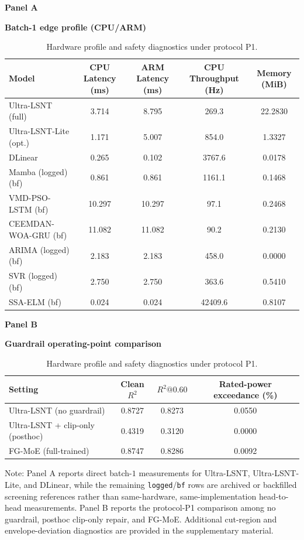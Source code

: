 ﻿\documentclass[review,1p,times]{elsarticle}
\newcommand{\aePanelHeading}[2]{%
  \par\vspace{2pt}%
  \noindent\begin{minipage}{\linewidth}
    \centering
    \textbf{#1}\par
    \textbf{#2}\par
  \end{minipage}%
  \par\vspace{2pt}%
}
\newcommand{\aeTableNote}[1]{%
  \par\vspace{2pt}%
  \noindent\begin{minipage}{\linewidth}
    \raggedright\footnotesize
    Note: #1
  \end{minipage}%
  \par
}
\begin{document}
\begin{table}[t]
\centering
\caption{Hardware profile and safety diagnostics under protocol P1.}
\label{tab:table4_hardware_safety}
\label{tab:main4_hardware_safety_joint}
\label{tab:master_hardware}
\label{tab:matrix_ablation_physics}
\footnotesize
\setlength{\tabcolsep}{4pt}
\aePanelHeading{Panel A}{Batch-1 edge profile (CPU/ARM)}
\begin{tabular*}{\linewidth}{@{\extracolsep{\fill}}lcccc@{}}
\toprule
\textbf{Model} & \textbf{CPU Latency (ms)} & \textbf{ARM Latency (ms)} & \textbf{CPU Throughput (Hz)} & \textbf{Memory (MiB)} \\
\midrule
Ultra-LSNT (full) & 3.714 & 8.795 & 269.3 & 22.2830 \\
Ultra-LSNT-Lite (opt.) & 1.171 & 5.007 & 854.0 & 1.3327 \\
DLinear & 0.265 & 0.102 & 3767.6 & 0.0178 \\
Mamba (logged) (bf) & 0.861 & 0.861 & 1161.1 & 0.1468 \\
VMD-PSO-LSTM (bf) & 10.297 & 10.297 & 97.1 & 0.2468 \\
CEEMDAN-WOA-GRU (bf) & 11.082 & 11.082 & 90.2 & 0.2130 \\
ARIMA (logged) (bf) & 2.183 & 2.183 & 458.0 & 0.0000 \\
SVR (logged) (bf) & 2.750 & 2.750 & 363.6 & 0.5410 \\
SSA-ELM (bf) & 0.024 & 0.024 & 42409.6 & 0.8107 \\
\bottomrule
\end{tabular*}
\vspace{4pt}
\aePanelHeading{Panel B}{Guardrail operating-point comparison}
\begin{tabular*}{0.82\linewidth}{@{\extracolsep{\fill}}lccc@{}}
\toprule
\textbf{Setting} & \textbf{Clean $R^2$} & \textbf{$R^2@0.60$} & \textbf{Rated-power exceedance (\%)} \\
\midrule
Ultra-LSNT (no guardrail) & 0.8727 & 0.8273 & 0.0550 \\
Ultra-LSNT + clip-only (posthoc) & 0.4319 & 0.3120 & 0.0000 \\
FG-MoE (full-trained) & 0.8747 & 0.8286 & 0.0092 \\
\bottomrule
\end{tabular*}
\aeTableNote{Panel A reports direct batch-$1$ measurements for Ultra-LSNT, Ultra-LSNT-Lite, and DLinear, while the remaining \texttt{logged}/\texttt{bf} rows are archived or backfilled screening references rather than same-hardware, same-implementation head-to-head measurements. Panel B reports the protocol-P1 comparison among no guardrail, posthoc clip-only repair, and FG-MoE. Additional cut-region and envelope-deviation diagnostics are provided in the supplementary material.}
\end{table}
\end{document}
